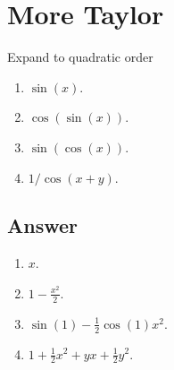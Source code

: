 \documentclass[10pt]{article}
\newcommand{\rd}{\text{ d}}
\renewcommand{\l}{\left(}
\renewcommand{\r}{\right)}
\begin{document}
\section{More Taylor}
Expand to quadratic order
\begin{enumerate}
\item $\sin(x)$.
\item $\cos(\sin(x))$.
\item $\sin(\cos(x))$.
\item $1/\cos(x+y)$.
\end{enumerate}
\begin{Answ}
\subsection{Answer}
\begin{enumerate}
\item $x$.
\item $1-\frac{x^2}{2}$.
\item $\sin(1)-\frac{1}{2}\cos(1)x^2$.
\item $1+\frac{1}{2}x^2+yx+\frac{1}{2}y^2$.
\end{enumerate}
\end{Answ}
%
%
%
%
%
%
%
%
\end{document}
